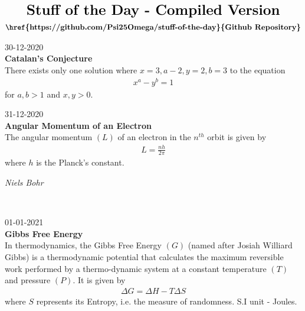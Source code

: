\documentclass{article}
\begin{document}
\begin{align*}
    \LARGE\textbf{Stuff of the Day - Compiled Version}
\end{align*}
\begin{align*}
\textbf{\href{https://github.com/Psi25Omega/stuff-of-the-day}{Github Repository}}
\end{align*}


\begin{tcolorbox}[enhanced,width=5in,sharp corners]
30-12-2020\\ \textbf{Catalan's Conjecture}\\ There exists only one solution where $x=3, a-2, y=2, b=3$ to the equation \begin{align*} x^a - y^b = 1 \end{align*} for $a,b > 1$ and $x,y > 0$.
\end{tcolorbox}
\begin{tcolorbox}[enhanced,width=5in,sharp corners]
31-12-2020\\ \textbf{Angular Momentum of an Electron}\\ The angular momentum $(L)$ of an electron in the $n^{th}$ orbit is given by \begin{align*} L = \frac{nh}{2\pi} \end{align*} where $h$ is the Planck's constant. \begin{flushright} \textit{Niels Bohr} \end{flushright}\\
\end{tcolorbox}
\begin{tcolorbox}[enhanced,width=5in,sharp corners]
01-01-2021\\ \textbf{Gibbs Free Energy}\\ In thermodynamics, the Gibbs Free Energy $(G)$ (named after Josiah Williard Gibbs) is a thermodynamic potential that calculates the maximum reversible work  performed by a thermo-dynamic system at a constant temperature $(T)$ and pressure $(P)$. It is given by \begin{align*} \Delta G=\Delta H-T\Delta S \end{align*} where $S$ represents its Entropy, i.e. the measure of randomness. S.I unit - Joules.
\end{tcolorbox}
\end{document}
